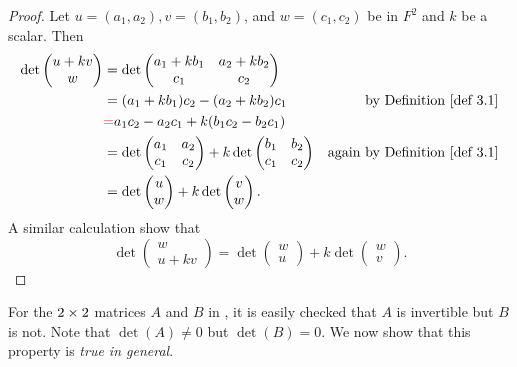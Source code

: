 \begin{proof}
Let \(u = (a_1, a_2), v = (b_1, b_2)\), and \(w = (c_1, c_2)\) be in \(F^2\) and \(k\) be a scalar.
Then
\begin{align*}
    \det\begin{pmatrix} u + kv \\ w \end{pmatrix}
        & = \det\begin{pmatrix} a_1 + k b_1 & a_2 + k b_2 \\ c_1 & c_2 \end{pmatrix} \\
        & = (a_1 + k b_1) c_2 - (a_2 + k b_2) c_1 & \text{by \DEF{3.1}} \\
        & \RED{ = } a_1 c_2 - a_2 c_1 + k(b_1 c_2 - b_2 c_1) \\
        & = \det\begin{pmatrix} a_1 & a_2 \\ c_1 & c_2 \end{pmatrix} + k \det\begin{pmatrix} b_1 & b_2 \\ c_1 & c_2 \end{pmatrix} & \text{again by \DEF{3.1}} \\
        & = \det\begin{pmatrix} u \\ w \end{pmatrix} + k \det\begin{pmatrix} v \\ w \end{pmatrix}.
\end{align*}
A similar calculation show that
\[
    \det\left(\begin{array}{c} w \\ u + k v \end{array}\right)
    = \det\left(\begin{array}{l} w \\ u \end{array}\right)
    + k \det\left(\begin{array}{l} w \\ v \end{array}\right).
\]
\end{proof}

\begin{note}
For the \(2 \times 2\) matrices \(A\) and \(B\) in , it is easily checked that \(A\) is invertible but \(B\) is not. Note that \(\det(A) \ne 0\) but \(\det(B) = 0\).
We now show that this property is \emph{true in general}.
\end{note}

